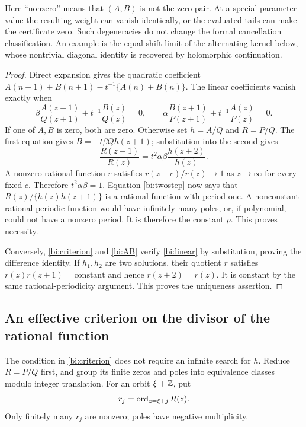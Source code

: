 Here ``nonzero'' means that $(A,B)$ is not the zero pair. At a special
parameter value the resulting weight can vanish identically, or the
evaluated tails can make the certificate zero. Such degeneracies do not
change the formal cancellation classification. An example is the
equal-shift limit of the alternating kernel below, whose nontrivial
diagonal identity is recovered by holomorphic continuation.

\begin{proof}
Direct expansion gives the quadratic coefficient
$A(n+1)+B(n+1)-t^{-1}\{A(n)+B(n)\}$. The linear coefficients vanish
exactly when
\begin{equation}\label{bi:linear}
 \beta\frac{A(z+1)}{Q(z+1)}+t^{-1}\frac{B(z)}{Q(z)}=0,
 \qquad
 \alpha\frac{B(z+1)}{P(z+1)}+t^{-1}\frac{A(z)}{P(z)}=0.
\end{equation}
If one of $A,B$ is zero, both are zero. Otherwise set
$h=A/Q$ and $R=P/Q$. The first equation gives
$B=-t\beta Qh(z+1)$; substitution into the second gives
\begin{equation}\label{bi:twostep}
 \frac{R(z+1)}{R(z)}
       =t^2\alpha\beta\frac{h(z+2)}{h(z)}.
\end{equation}
A nonzero rational function $r$ satisfies $r(z+c)/r(z)\to1$ as
$z\to\infty$ for every fixed $c$. Therefore
$t^2\alpha\beta=1$. Equation \eqref{bi:twostep} now says that
$R(z)/\{h(z)h(z+1)\}$ is a rational function with period one.
A nonconstant rational periodic function would have infinitely many
poles, or, if polynomial, could not have a nonzero period. It is
therefore the constant $\rho$. This proves necessity.

Conversely, \eqref{bi:criterion} and \eqref{bi:AB} verify
\eqref{bi:linear} by substitution, proving the difference identity.
If $h_1,h_2$ are two solutions, their quotient $r$ satisfies
$r(z)r(z+1)=\text{constant}$ and hence $r(z+2)=r(z)$.
It is constant by the same rational-periodicity argument. This proves
the uniqueness assertion.
\end{proof}

\subsection{An effective criterion on the divisor of the rational function}

The condition in \eqref{bi:criterion} does not require an infinite
search for $h$. Reduce $R=P/Q$ first, and group its finite zeros and
poles into equivalence classes modulo integer translation. For an orbit
$\xi+\mathbb Z$, put
\[
 r_j=\operatorname{ord}_{z=\xi+j}R(z).
\]
Only finitely many $r_j$ are nonzero; poles have negative multiplicity.


